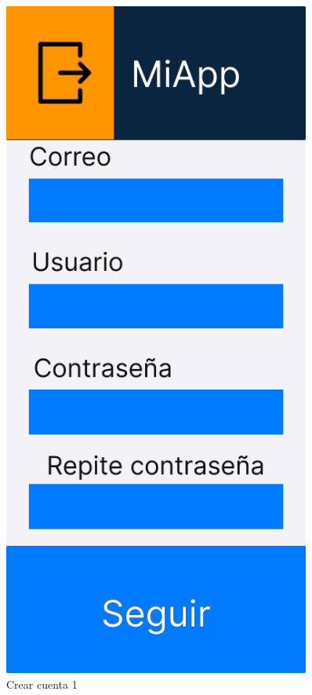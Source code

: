 \begin{figure}[H]
   \centering
   \begin{minipage}{0.45\textwidth}
      \centering
      \includegraphics[width=0.9\textwidth]{fotos/Frame 24.png}
      \caption{Crear cuenta 1}

\end{minipage}
\end{figure}
